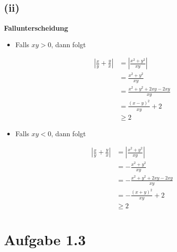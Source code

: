 \documentclass[12pt]{extarticle}
\begin{document}
\subsection*{(ii)}
\textbf{Fallunterscheidung}
\begin{itemize}
\item Falls \(xy > 0\), dann folgt

\begin{align*}
  \left| \frac{x}{y} + \frac{y}{x} \right|
  &= \left| \frac{x^2+y^2}{xy} \right|\\
  &= \frac{x^2+y^2}{xy} \tag*{\(xy>0\)}\\
  &= \frac{x^2+y^2+2xy-2xy}{xy} \\
  &= \frac{(x-y)^2}{xy} + 2 \\
  &\geq 2
\end{align*}

\item Falls \(xy < 0\), dann folgt

\begin{align*}
  \left| \frac{x}{y} + \frac{y}{x} \right|
  &= \left| \frac{x^2+y^2}{xy} \right|\\
  &= - \frac{x^2+y^2}{xy} \tag*{\(xy<0\)}\\
  &= - \frac{x^2+y^2+2xy-2xy}{xy} \\
  &= - \frac{(x+y)^2}{xy} + 2 \\
  &\geq 2
\end{align*}
\end{itemize}

\section*{Aufgabe 1.3}
\end{document}
